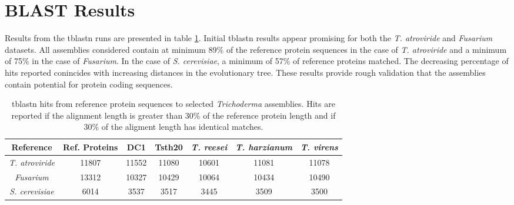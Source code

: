 \section{BLAST Results}
Results from the tblastn runs are presented in table
\ref{table:tblastn}. Initial tblastn results appear promising for both
the \textit{T. atroviride} and \textit{Fusarium} datasets. All
assemblies considered contain at minimum 89\% of the reference protein
sequences in the case of \textit{T. atroviride} and a minimum of 75\%
in the case of \textit{Fusarium}. In the case of
\textit{S. cerevisiae}, a minimum of 57\% of reference proteins
matched. The decreasing percentage of hits reported conincides with
increasing distances in the evolutionary tree. These results provide
rough validation that the assemblies contain potential for protein
coding sequences.


\begin{table}
  \centering
  \begin{tabular}{|c|c|c|c|c|c|c|}
    \hline
    Reference & Ref. Proteins & DC1 & Tsth20 & \textit{T. reesei} & \textit{T. harzianum} & \textit{T. virens}  \\ \hline
    \textit{T. atroviride} & 11807 & 11552 & 11080 & 10601 & 11081 & 11078 \\ \hline 
    \textit{Fusarium} & 13312 & 10327 & 10429 & 10064 & 10434 & 10490 \\ \hline
    \textit{S. cerevisiae} & 6014 & 3537 & 3517 & 3445 & 3509 & 3500 \\ \hline
  \end{tabular}
  \caption{tblastn hits from reference protein sequences to selected
    \textit{Trichoderma} assemblies. Hits are reported if the
    alignment length is greater than 30\% of the reference protein
    length and if 30\% of the aligment length has identical matches.}
  \label{table:tblastn}
\end{table}
